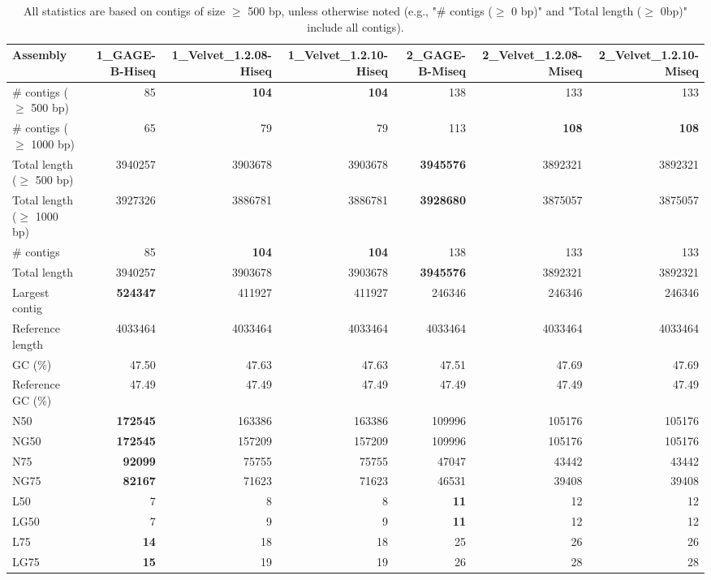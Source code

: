 \documentclass[12pt,a4paper]{article}
\begin{document}
\begin{table}[ht]
\begin{center}
\caption{All statistics are based on contigs of size $\geq$ 500 bp, unless otherwise noted (e.g., "\# contigs ($\geq$ 0 bp)" and "Total length ($\geq$ 0bp)" include all contigs).}
\begin{tabular}{|l*{6}{|r}|}
\hline
Assembly & 1\_GAGE-B-Hiseq & 1\_Velvet\_1.2.08-Hiseq & 1\_Velvet\_1.2.10-Hiseq & 2\_GAGE-B-Miseq & 2\_Velvet\_1.2.08-Miseq & 2\_Velvet\_1.2.10-Miseq \\ \hline
\# contigs ($\geq$ 500 bp) & 85 & {\bf 104} & {\bf 104} & 138 & 133 & 133 \\ \hline
\# contigs ($\geq$ 1000 bp) & 65 & 79 & 79 & 113 & {\bf 108} & {\bf 108} \\ \hline
Total length ($\geq$ 500 bp) & 3940257 & 3903678 & 3903678 & {\bf 3945576} & 3892321 & 3892321 \\ \hline
Total length ($\geq$ 1000 bp) & 3927326 & 3886781 & 3886781 & {\bf 3928680} & 3875057 & 3875057 \\ \hline
\# contigs & 85 & {\bf 104} & {\bf 104} & 138 & 133 & 133 \\ \hline
Total length & 3940257 & 3903678 & 3903678 & {\bf 3945576} & 3892321 & 3892321 \\ \hline
Largest contig & {\bf 524347} & 411927 & 411927 & 246346 & 246346 & 246346 \\ \hline
Reference length & 4033464 & 4033464 & 4033464 & 4033464 & 4033464 & 4033464 \\ \hline
GC (\%) & 47.50 & 47.63 & 47.63 & 47.51 & 47.69 & 47.69 \\ \hline
Reference GC (\%) & 47.49 & 47.49 & 47.49 & 47.49 & 47.49 & 47.49 \\ \hline
N50 & {\bf 172545} & 163386 & 163386 & 109996 & 105176 & 105176 \\ \hline
NG50 & {\bf 172545} & 157209 & 157209 & 109996 & 105176 & 105176 \\ \hline
N75 & {\bf 92099} & 75755 & 75755 & 47047 & 43442 & 43442 \\ \hline
NG75 & {\bf 82167} & 71623 & 71623 & 46531 & 39408 & 39408 \\ \hline
L50 & 7 & 8 & 8 & {\bf 11} & 12 & 12 \\ \hline
LG50 & 7 & 9 & 9 & {\bf 11} & 12 & 12 \\ \hline
L75 & {\bf 14} & 18 & 18 & 25 & 26 & 26 \\ \hline
LG75 & {\bf 15} & 19 & 19 & 26 & 28 & 28 \\ \hline

\end{tabular}
\end{center}
\end{table}
\end{document}
